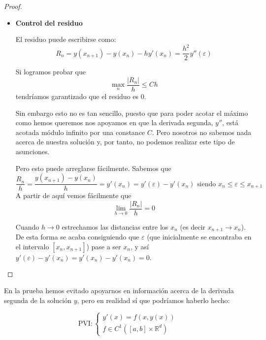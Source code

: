 \documentclass{apuntes}
\begin{document}
\begin{proof}
\begin{itemize}
%
%
%

\item \textbf{Control del residuo}

El residuo puede escribirse como:
\[R_n = y(x_{n+1})-y(x_n)-hy'(x_n) = \frac{h^2}{2}y''(ε)\]

Si logramos probar que
\[\max_n \frac{|R_n|}{h} \leq C h\]
tendríamos garantizado que el residuo es 0.

Sin embargo esto no es tan sencillo, puesto que para poder acotar el máximo como hemos queremos nos apoyamos en que la derivada segunda, $y''$, está acotada módulo infinito por una constance $C$. Pero nosotros no sabemos nada acerca de nuestra solución y, por tanto, no podemos realizar este tipo de asunciones.

Pero esto puede arreglarse fácilmente. Sabemos que
\[\frac{R_n}{h} = \frac{y(x_{n+1})-y(x_n)}{h} = y'(x_n) = y'(ε)-y'(x_n) \text{ siendo } x_n \leq ε \leq x_{n+1}\]
A partir de aquí vemos fácilmente que
\[\lim_{h\to 0} \frac{|R_n|}{h} = 0\]

Cuando $h \rightarrow 0$ estrechamos las distancias entre los $x_n$ (es decir $x_{n+1} \rightarrow x_n$). De esta forma se acaba consiguiendo que $ε$ (que inicialmente se encontraba en el intervalo $[x_n,x_{n+1}]$) pase a ser $x_n$, y así $y'(ε)-y'(x_n) = y'(x_n)-y'(x_n) = 0$.

\end{itemize}
\end{proof}

\obs En la prueba hemos evitado apoyarnos en información acerca de la derivada segunda de la solución $y$, pero en realidad sí que podríamos haberlo hecho:

\[
	\text{PVI} :
		\begin{cases}
			y'(x) = f(x,y(x)) \\
			f ∈ C^1([a,b]×ℝ^d)
		\end{cases}
\]
\end{document}
